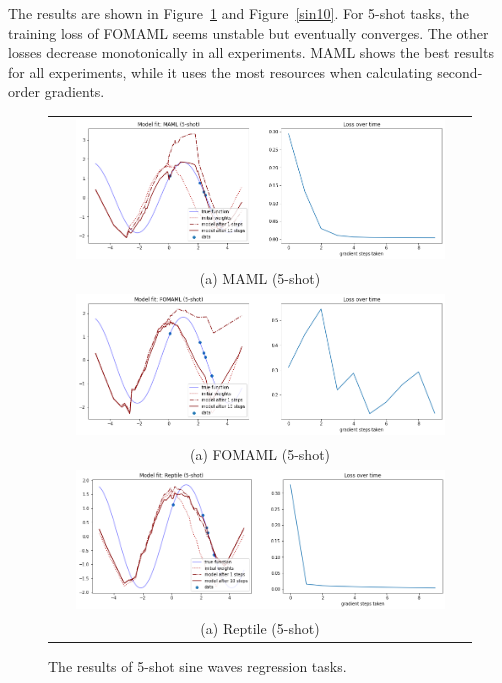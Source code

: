 \documentclass[final]{cvpr}
\begin{document}
The results are shown in Figure~\ref{sin5} and Figure~\ref{sin10}. For 5-shot tasks, the training loss of FOMAML seems unstable but eventually converges. The other losses decrease monotonically in all experiments. MAML shows the best results for all experiments, while it uses the most resources when calculating second-order gradients.

\begin{figure}[b]
    \centering
	\begin{tabular}{c}
		\includegraphics[width=0.9\textwidth]{resources/maml_5.png}\\
		(a) MAML (5-shot) \\
		\includegraphics[width=0.9\textwidth]{resources/fomaml_5.png}\\
		(a) FOMAML (5-shot) \\
		\includegraphics[width=0.9\textwidth]{resources/reptile_5.png}\\
		(a) Reptile (5-shot) \\
	\end{tabular}\vspace{0.2cm}
	\caption{The results of 5-shot sine waves regression tasks.}
	\label{sin5}
\end{figure}
\end{document}
